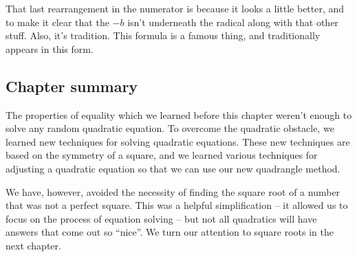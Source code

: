 That last rearrangement in the numerator is because it looks a little better, and to make it clear that the $-b$ isn't underneath the radical along with that other stuff. Also, it's tradition. This formula is a famous thing, and traditionally appears in this form.

\subsection*{Chapter summary}

The properties of equality which we learned before this chapter weren't enough to solve any random quadratic equation. To overcome the quadratic obstacle, we learned new techniques for solving quadratic equations. These new techniques are based on the symmetry of a square, and we learned various techniques for adjusting a quadratic equation so that we can use our new quadrangle method.

We have, however, avoided the necessity of finding the square root of a number that was not a perfect square. This was a helpful simplification -- it allowed us to focus on the process of equation solving -- but not all quadratics will have answers that come out so ``nice''. We turn our attention to square roots in the next chapter.
